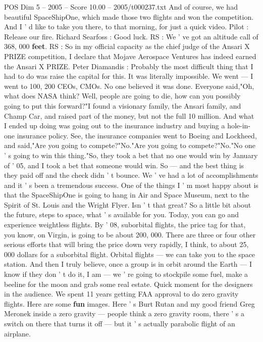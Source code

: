 \begin{textsample}{POS Dim 5 – 2005 – Score 10.00 – 2005/t000237.txt}
And of course, we had beautiful SpaceShipOne, which made those two flights and won the competition.
And I ' d like to take you there, to that morning, for just a quick video.
Pilot : Release our fire.
Richard Searfoss : Good luck.
RS : We ' ve got an altitude call of 368, 000 \textbf{feet}.
RS : So in my official capacity as the chief judge of the Ansari X PRIZE competition, I declare that Mojave Aerospace Ventures has indeed earned the Ansari X PRIZE.
Peter Diamandis : Probably the most difficult thing that I had to do was raise the capital for this.
It was literally impossible.
We went — I went to 100, 200 CEOs, CMOs.
No one believed it was done.
Everyone said,"Oh, what does NASA think?
Well, people are going to die, how can you possibly going to put this forward?"I found a visionary family, the Ansari family, and Champ Car, and raised part of the money, but not the full 10 million.
And what I ended up doing was going out to the insurance industry and buying a hole-in-one insurance policy.
See, the insurance companies went to Boeing and Lockheed, and said,"Are you going to compete?"No."Are you going to compete?"No."No one ' s going to win this thing."So, they took a bet that no one would win by January of ' 05, and I took a bet that someone would win.
So — and the best thing is they paid off and the check didn ' t bounce.
We ' ve had a lot of accomplishments and it ' s been a tremendous success.
One of the things I ' m most happy about is that the SpaceShipOne is going to hang in Air and Space Museum, next to the Spirit of St.
Louis and the Wright Flyer.
Isn ' t that great?
So a little bit about the future, steps to space, what ' s available for you.
Today, you can go and experience weightless flights.
By ' 08, suborbital flights, the price tag for that, you know, on Virgin, is going to be about 200, 000.
There are three or four other serious efforts that will bring the price down very rapidly, I think, to about 25, 000 dollars for a suborbital flight.
Orbital flights — we can take you to the space station.
And then I truly believe, once a group is in orbit around the Earth — I know if they don ' t do it, I am — we ' re going to stockpile some fuel, make a beeline for the moon and grab some real estate.
Quick moment for the designers in the audience.
We spent 11 years getting FAA approval to do zero gravity flights.
Here are some \textbf{fun} images.
Here ' s Burt Rutan and my good friend Greg Meronek inside a zero gravity — people think a zero gravity room, there ' s a switch on there that turns it off — but it ' s actually parabolic flight of an airplane.

\end{textsample}
